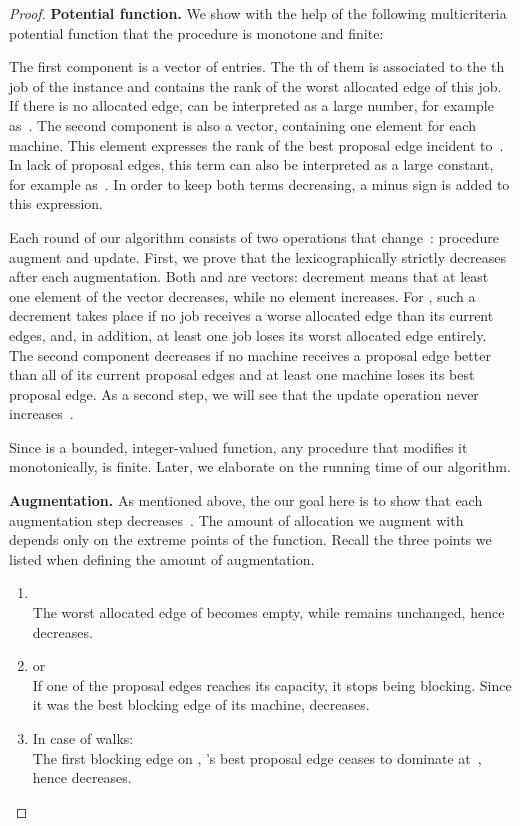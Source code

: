 \documentclass{llncs}
\begin{document}
\begin{proof}


\textbf{Potential function. }
We show with the help of the following multicriteria potential function that the procedure is monotone and finite:



The first component is a vector of  entries. The th of them is associated to the th job of the instance and contains the rank of the worst allocated edge of this job. If there is no allocated edge,  can be interpreted as a large number, for example as~. The second component is also a vector, containing one element for each machine. This element expresses the rank of the best proposal edge incident to~. In lack of proposal edges, this term can also be interpreted as a large constant, for example as~. In order to keep both terms decreasing, a minus sign is added to this expression.

Each round of our algorithm consists of two operations that change~: procedure augment and update. First, we prove that the  lexicographically strictly decreases after each augmentation. Both  and  are vectors: decrement means that at least one element of the vector decreases, while no element increases. For , such a decrement takes place if no job receives a worse allocated edge than its current edges, and, in addition, at least one job loses its worst allocated edge entirely. The second component  decreases if no machine receives a proposal edge better than all of its current proposal edges and at least one machine loses its best proposal edge. As a second step, we will see that the update operation never increases~.

Since  is a bounded, integer-valued function, any procedure that modifies it monotonically, is finite. Later, we elaborate on the running time of our algorithm.

\textbf{Augmentation.} As mentioned above, the our goal here is to show that each augmentation step decreases~. The amount of allocation we augment with depends only on the extreme points of the  function. Recall the three points we listed when defining the amount of augmentation.
\begin{enumerate}
	\item  \\ The worst allocated edge of  becomes empty, while  remains unchanged, hence  decreases.
	\item  or  \\ If one of the proposal edges reaches its capacity, it stops being blocking. Since it was the best blocking edge of its machine,  decreases.
	\item In case of walks:  \\ The first blocking edge on , 's best proposal edge ceases to dominate  at~, hence  decreases.
\end{enumerate}


\end{proof}
\end{document}
